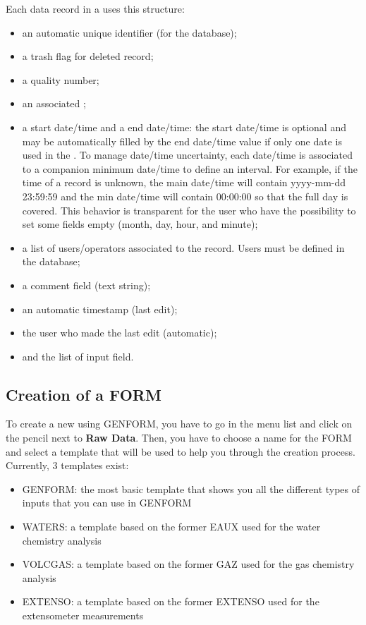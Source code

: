 Each data record in a  uses this structure:
\begin{itemize}
	\item an automatic unique identifier (for the database);
	\item a trash flag for deleted record;
	\item a quality number;
	\item an associated ;
	\item a start date/time and a end date/time: the start date/time is optional and may be automatically filled by the end date/time value if only one date is used in the . To manage date/time uncertainty, each date/time is associated to a companion minimum date/time to define an interval. For example, if the time of a record is unknown, the main date/time will contain yyyy-mm-dd 23:59:59 and the min date/time will contain 00:00:00 so that the full day is covered. This behavior is transparent for the user who have the possibility to set some fields empty (month, day, hour, and minute);
	\item a list of users/operators associated to the record. Users must be defined in the  \webobs database;
	\item a comment field (text string);
	\item an automatic timestamp (last edit);
	\item the user who made the last edit (automatic);
	\item and the list of input field.
\end{itemize}

\subsection{Creation of a FORM} \label{genform_creation}

To create a new  using GENFORM, you have to go in the  menu list and click on the pencil next to \textbf{Raw Data}. Then, you have to choose a name for the FORM and select a template that will be used to help you through the creation process. Currently, 3 templates exist:

\begin{itemize}
	\item GENFORM: the most basic template that shows you all the different types of inputs that you can use in GENFORM
	\item WATERS: a template based on the former EAUX  used for the water chemistry analysis
	\item VOLCGAS: a template based on the former GAZ  used for the gas chemistry analysis
	\item EXTENSO: a template based on the former EXTENSO  used for the extensometer measurements
\end{itemize}

